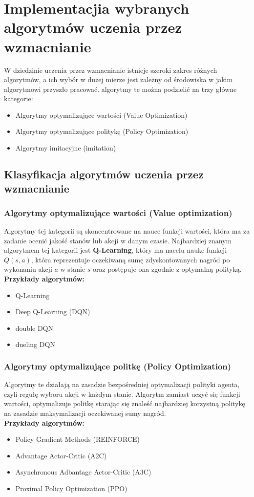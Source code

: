 \documentclass[a4paper, 12pt]{article}
\begin{document}
    \section{Implementacjia wybranych algorytmów uczenia przez wzmacnianie}
    W dziedzinie uczenia przez wzmacnianie istnieje szeroki zakres różnych algorytmów, a ich wybór w dużej mierze
    jest zależny od środowiska w jakim algorytmowi przyszło pracować. algorytmy te można podzielić na trzy główne kategorie:
    \begin{itemize}
        \item Algorytmy optymalizujące wartości (Value Optimization)
        \item Algorytmy optymalizujące politykę (Policy Optimization)
        \item Algorytmy imitacyjne (imitation)
    \end{itemize}
    \subsection{Klasyfikacja algorytmów uczenia przez wzmacnianie}
    \subsubsection{Algorytmy optymalizujące wartości (Value optimization)}
    Algorytmy tej kategorii są skoncentrowane na nauce funkcji wartości, która ma za zadanie ocenić jakość stanów lub akcji w danym czasie.
    Najbardziej znanym algorytmem tej kategorii jest \textbf{Q-Learning}, który ma nacelu nauke funkcji \textbf{\( Q(s,a) \)}, 
    która reprezentuje oczekiwaną sumę zdyskontowanych nagród po wykonaniu akcji \( a \) w stanie \( s \) oraz postępuje ona zgodnie z optymalną polityką.
    \\ \textbf{Przykłady algorytmów:}
    \begin{itemize}
        \item Q-Learning
        \item Deep Q-Learning (DQN)
        \item double DQN
        \item dueling DQN
    \end{itemize}
    \subsubsection{Algorytmy optymalizujące politkę (Policy Optimization)}
    Algorytmy te działają na zasadzie bezpośredniej optymalizacji polityki agenta, czyli regułę wyboru akcji w każdym stanie.
    Algorytm zamiast uczyć się funkcji wartości, optymalizuje politkę starając się znaleść najbardziej korzystną politykę na zasadzie maksymalizacji
    oczekiwanej sumy nagród.
    \\ \textbf{Przykłady algorytmów:}
    \begin{itemize}
        \item Policy Gradient Methods (REINFORCE)
        \item Advantage Actor-Critic (A2C)
        \item Asynchronous Adbantage Actor-Critic (A3C)
        \item Proximal Policy Optimization (PPO)
    \end{itemize}
\end{document}
